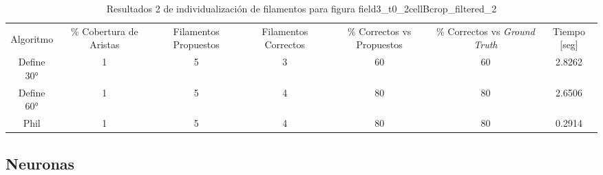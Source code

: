 \begin{table}[h]
    \centering
    \begin{tabular}{|c|c|c|c|c|c|c|}
    \hline
         & \multirow{4}{2cm}{\centering \% Cobertura de Aristas} & \multirow{4}{2cm}{Filamentos Propuestos} & \multirow{4}{2cm}{Filamentos Correctos} & \multirow{4}{2.5cm}{\% Correctos vs Propuestos} & \multirow{4}{2.5cm}{\centering \% Correctos vs {\it Ground Truth}} & \multirow{4}{1.2cm}{\centering Tiempo [seg]} \\
         &  &  &  & & &  \\
        Algoritmo &  &  &  & & &  \\
        &  &  &  & & &  \\ \hline
        Define 30° & 1 & 5 & 3 & 60 & 60 & 2.8262\\
        Define 60° & 1 & 5 & 4 & 80 & 80 & 2.6506\\ 
        Phil & 1 & 5 & 4 & 80 & 80 & 0.2914\\
        \hline
    \end{tabular}
    \caption{Resultados 2 de individualizaci\'on de filamentos para figura field3_t0_2cellBcrop_filtered_2}
    \label{tab:field3t0filtered2-2}
\end{table}

\subsection{Neuronas}